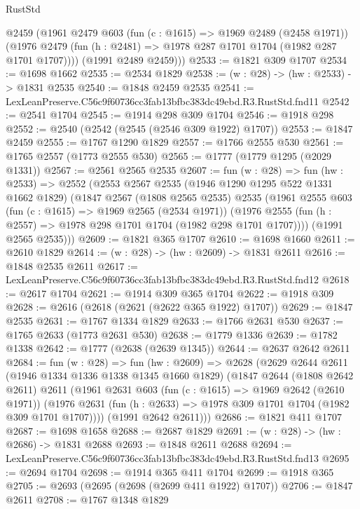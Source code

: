 \begin{lexlean}{RustStd}
\begin{coremodule}
        @2459
        (@1961
          @2479
          @603
          (fun (c : @1615) => @1969 @2489 (@2458 @1971))
          (@1976 @2479 (fun (h : @2481) => @1978 @287 @1701 @1704 (@1982 @287 @1701 @1707))))
        (@1991 @2489 @2459)))
@2533 := @1821 @309 @1707
@2534 := @1698 @1662
@2535 := @2534 @1829
@2538 := (w : @28) -> (hw : @2533) -> @1831 @2535
@2540 := @1848 @2459 @2535
@2541 := LexLeanPreserve.C56c9f60736cc3fab13bfbc383dc49ebd.R3.RustStd.fnd11
@2542 := @2541 @1704
@2545 := @1914 @298 @309 @1704
@2546 := @1918 @298
@2552 := @2540 (@2542 (@2545 (@2546 @309 @1922) @1707))
@2553 := @1847 @2459
@2555 := @1767 @1290 @1829
@2557 := @1766 @2555 @530
@2561 := @1765 @2557 (@1773 @2555 @530)
@2565 := @1777 (@1779 @1295 (@2029 @1331))
@2567 := @2561 @2565 @2535
@2607 := fun (w : @28) =>
  fun (hw : @2533) =>
  @2552
    (@2553
      @2567
      @2535
      (@1946 @1290 @1295 @522 @1331 @1662 @1829)
      (@1847
        @2567
        (@1808 @2565 @2535)
        @2535
        (@1961
          @2555
          @603
          (fun (c : @1615) => @1969 @2565 (@2534 @1971))
          (@1976 @2555 (fun (h : @2557) => @1978 @298 @1701 @1704 (@1982 @298 @1701 @1707))))
        (@1991 @2565 @2535)))
@2609 := @1821 @365 @1707
@2610 := @1698 @1660
@2611 := @2610 @1829
@2614 := (w : @28) -> (hw : @2609) -> @1831 @2611
@2616 := @1848 @2535 @2611
@2617 := LexLeanPreserve.C56c9f60736cc3fab13bfbc383dc49ebd.R3.RustStd.fnd12
@2618 := @2617 @1704
@2621 := @1914 @309 @365 @1704
@2622 := @1918 @309
@2628 := @2616 (@2618 (@2621 (@2622 @365 @1922) @1707))
@2629 := @1847 @2535
@2631 := @1767 @1334 @1829
@2633 := @1766 @2631 @530
@2637 := @1765 @2633 (@1773 @2631 @530)
@2638 := @1779 @1336
@2639 := @1782 @1338
@2642 := @1777 (@2638 (@2639 @1345))
@2644 := @2637 @2642 @2611
@2684 := fun (w : @28) =>
  fun (hw : @2609) =>
  @2628
    (@2629
      @2644
      @2611
      (@1946 @1334 @1336 @1338 @1345 @1660 @1829)
      (@1847
        @2644
        (@1808 @2642 @2611)
        @2611
        (@1961
          @2631
          @603
          (fun (c : @1615) => @1969 @2642 (@2610 @1971))
          (@1976 @2631 (fun (h : @2633) => @1978 @309 @1701 @1704 (@1982 @309 @1701 @1707))))
        (@1991 @2642 @2611)))
@2686 := @1821 @411 @1707
@2687 := @1698 @1658
@2688 := @2687 @1829
@2691 := (w : @28) -> (hw : @2686) -> @1831 @2688
@2693 := @1848 @2611 @2688
@2694 := LexLeanPreserve.C56c9f60736cc3fab13bfbc383dc49ebd.R3.RustStd.fnd13
@2695 := @2694 @1704
@2698 := @1914 @365 @411 @1704
@2699 := @1918 @365
@2705 := @2693 (@2695 (@2698 (@2699 @411 @1922) @1707))
@2706 := @1847 @2611
@2708 := @1767 @1348 @1829

\end{coremodule}
\end{lexlean}
